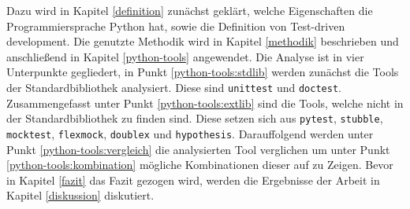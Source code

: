 Dazu wird in Kapitel \ref{definition} zunächst geklärt, welche Eigenschaften
die Programmiersprache Python hat, sowie die Definition von Test-driven
development. Die genutzte Methodik wird in Kapitel \ref{methodik} beschrieben
und anschließend in Kapitel \ref{python-tools} angewendet. Die Analyse ist in
vier Unterpunkte gegliedert, in Punkt \ref{python-tools:stdlib} werden zunächst
die Tools der Standardbibliothek analysiert. Diese sind \lstinline{unittest}
und \lstinline{doctest}. Zusammengefasst unter Punkt \ref{python-tools:extlib}
sind die Tools, welche nicht in der Standardbibliothek zu finden sind. Diese
setzen sich aus \lstinline{pytest}, \lstinline{stubble}, \lstinline{mocktest},
\lstinline{flexmock}, \lstinline{doublex} und \lstinline{hypothesis}.
Darauffolgend werden unter Punkt \ref{python-tools:vergleich} die analysierten
Tool verglichen um unter Punkt \ref{python-tools:kombination} mögliche
Kombinationen dieser auf zu Zeigen. Bevor in Kapitel \ref{fazit} das Fazit
gezogen wird, werden die Ergebnisse der Arbeit in Kapitel \ref{diskussion}
diskutiert.